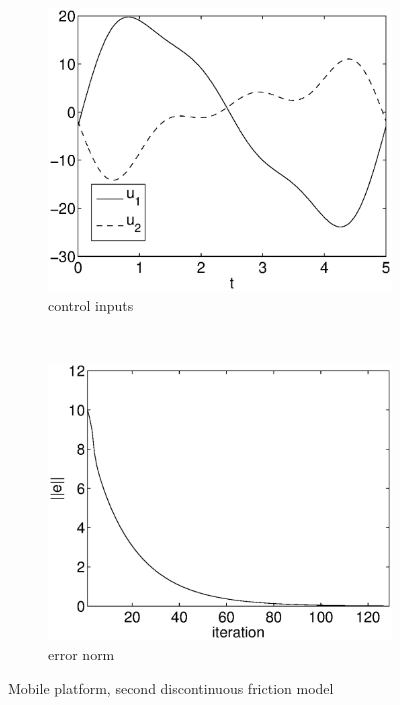 \begin{figure}[h]
\begin{subfigure}[b]{0.45\textwidth}
\centering
\includegraphics[width=\textwidth]{img/discont_ok_u.eps}
\caption{control inputs}
\end{subfigure}
~
\begin{subfigure}[b]{0.45\textwidth}
\centering
\includegraphics[width=\textwidth]{img/discont_ok_err.eps}
\caption{error norm}
\end{subfigure}
\caption{Mobile platform, second discontinuous friction model}
\label{fig:pr_discont_ok}
\end{figure}